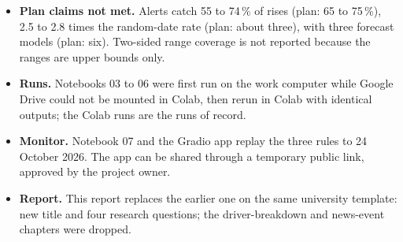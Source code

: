 \begin{itemize}[leftmargin=*,itemsep=2pt]
\item \textbf{Plan claims not met.} Alerts catch 55 to 74\,\% of rises (plan: 65 to 75\,\%), 2.5 to 2.8 times the random-date rate (plan: about three), with three forecast models (plan: six). Two-sided range coverage is not reported because the ranges are upper bounds only.
\item \textbf{Runs.} Notebooks 03 to 06 were first run on the work computer while Google Drive could not be mounted in Colab, then rerun in Colab with identical outputs; the Colab runs are the runs of record.
\item \textbf{Monitor.} Notebook 07 and the Gradio app replay the three rules to 24 October 2026. The app can be shared through a temporary public link, approved by the project owner.
\item \textbf{Report.} This report replaces the earlier one on the same university template: new title and four research questions; the driver-breakdown and news-event chapters were dropped.
\end{itemize}
